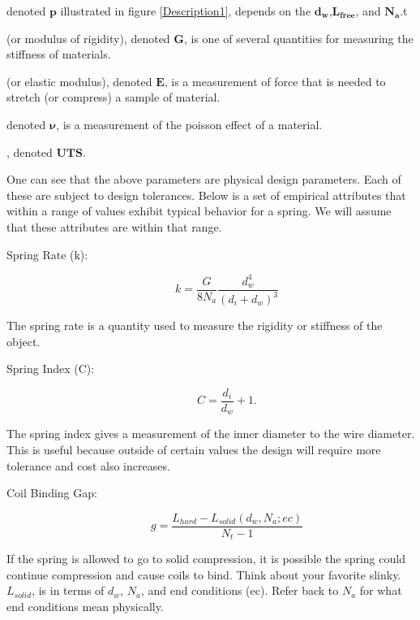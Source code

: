 \documentclass[10pt]{article}
\begin{document}
\begin{description}[leftmargin=!,labelwidth=\widthof{\bfseries Outer diameter:}]
			\item[Pitch:] denoted $\mathbf{p}$ illustrated in figure \ref{Description1}, depends on the $\mathbf{d_{w}}$,$\mathbf{L_{free}}$, and $\mathbf{N_{a}}$.t			
			
			\item[Shear modulus:] (or modulus of rigidity), denoted $\mathbf{G}$, is one of several quantities for measuring the stiffness of materials.
			
			\item[Young's modulus:] (or elastic modulus), denoted $\mathbf{E}$, is a measurement of force that is needed  to stretch (or compress) a sample of material.
			
			\item[Poisson ratio:] denoted $\mathbf{\nu}$, is a measurement of the poisson effect of a material. 
			
			\item[Ultimate torsional stress:], denoted $\mathbf{UTS}$. 
		
		\end{description}

One can see that the above parameters are physical design parameters. Each of these are subject to design tolerances. Below is a set of empirical attributes that within a range of values exhibit typical behavior for a spring. We will assume that these attributes are within that range. 
			
			\begin{description}
				\item [Spring Rate (k):] \begin{equation} k = \frac{G}{8N_{a}}\frac{d_{w}^{4}}{(d_{i} + d_{w})^{3}}\end{equation}
				\end{description}
			The spring rate is a quantity used to measure the rigidity or stiffness of the object. 
			\begin{description}	
			\item[Spring Index (C):]\begin{equation}C = \frac{d_{i}}{d_{w}} + 1.\end{equation}
			\end{description}
				 The spring index gives a measurement of the inner diameter to the wire diameter. This is useful because outside of certain values the design will require more tolerance and cost also increases. \cite{SpringIndex}
			\begin{description}	
			\item[Coil Binding Gap:]\begin{equation} g = \frac{L_{hard} - L_{solid}(d_{w},N_{a}; ec)}{N_{t} - 1}\end{equation}
			\end{description}
				If the spring is allowed to go to solid compression, it is possible the spring could continue compression and cause coils to bind. Think about your favorite slinky. $L_{solid}$, is in terms of $d_{w}$, $N_{a}$, and end conditions (ec). Refer back to $N_{a}$ for what end conditions mean physically.
		
\end{document}
